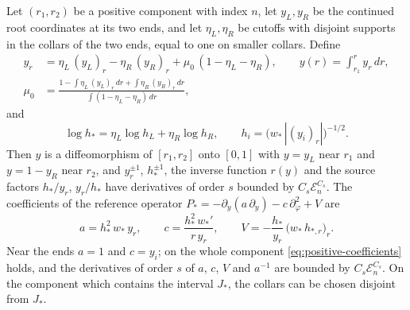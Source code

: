\begin{lemma}
\label{lem:positive-reference-charts}
\label{lem:positive-reference-coefficient-bounds}
Let $(r_1,r_2)$ be a positive component with index $n$, let
$y_L,y_R$ be the continued root coordinates at its two ends, and let
$\eta_L,\eta_R$ be cutoffs with disjoint supports in the collars of
the two ends, equal to one on smaller collars. Define
\begin{equation}\label{eq:geometry-positive-coordinate}
 \begin{split}
 y_r&=\eta_L\,(y_L)_r-\eta_R\,(y_R)_r+\mu_0\,(1-\eta_L-\eta_R),
 \qquad y(r)=\int_{r_1}^ry_r\,dr,\\
 \mu_0&=\frac{1-\int\eta_L\,(y_L)_r\,dr+\int\eta_R\,(y_R)_r\,dr}
            {\int(1-\eta_L-\eta_R)\,dr},
 \end{split}
\end{equation}
and
\begin{equation}\label{eq:geometry-positive-height}
 \log h_*=\eta_L\log h_L+\eta_R\log h_R,
 \qquad h_i=\bigl(w_*\,|(y_i)_r|\bigr)^{-1/2}.
\end{equation}
Then $y$ is a diffeomorphism of $[r_1,r_2]$ onto $[0,1]$ with
$y=y_L$ near $r_1$ and $y=1-y_R$ near $r_2$, and $y_r^{\pm1}$,
$h_*^{\pm1}$, the inverse function $r(y)$ and the source factors
$h_*/y_r$, $y_r/h_*$ have derivatives of order $s$ bounded by
$C_s\mathcal E_n^{C_s}$. The coefficients of the reference operator
$P_*=-\partial_y(a\,\partial_y)-c\,\partial_\varphi^2+V$ are
\begin{equation}\label{eq:geometry-positive-coefficients}
 a=h_*^2\,w_*\,y_r,\qquad
 c=\frac{h_*^2\,w_*'}{r\,y_r},\qquad
 V=-\frac{h_*}{y_r}\,\bigl(w_*\,h_{*,r}\bigr)_r .
\end{equation}
Near the ends $a=1$ and $c=y_i$; on the whole component
\eqref{eq:positive-coefficients} holds, and the derivatives of order
$s$ of $a$, $c$, $V$ and $a^{-1}$ are bounded by
$C_s\mathcal E_n^{C_s}$. On the component which contains the interval
$J_*$, the collars can be chosen disjoint from $J_*$.
\end{lemma}

